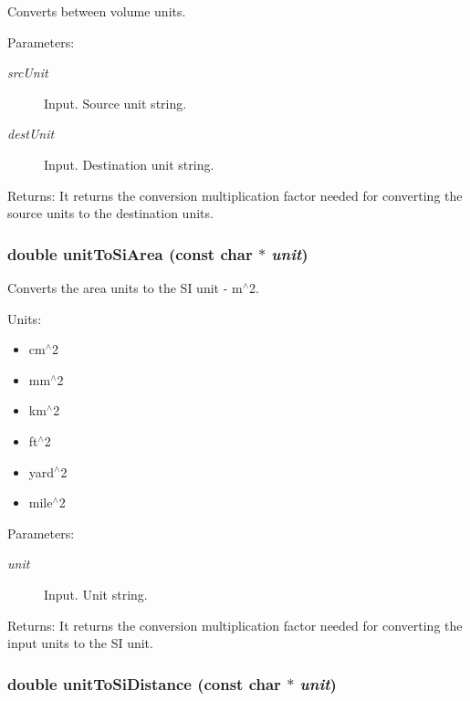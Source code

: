 Converts between volume units. 

\begin{Desc}
\item[Parameters:]
\begin{description}
\item[{\em srcUnit}]Input. Source unit string. \item[{\em destUnit}]Input. Destination unit string.\end{description}
\end{Desc}
\begin{Desc}
\item[Returns:]It returns the conversion multiplication factor needed for converting the source units to the destination units. \end{Desc}
\hypertarget{group__unit__conv_g9a55776d67d05ae1fccb1c8d9fe284f1}{
\subsubsection[unitToSiArea]{\setlength{\rightskip}{0pt plus 5cm}double unitToSiArea (const char $\ast$ {\em unit})}}
\label{group__unit__conv_g9a55776d67d05ae1fccb1c8d9fe284f1}


Converts the area units to the SI unit - m$^\wedge$2. 

Units:\begin{itemize}
\item cm$^\wedge$2\item mm$^\wedge$2\item km$^\wedge$2\item ft$^\wedge$2\item yard$^\wedge$2\item mile$^\wedge$2\end{itemize}


\begin{Desc}
\item[Parameters:]
\begin{description}
\item[{\em unit}]Input. Unit string.\end{description}
\end{Desc}
\begin{Desc}
\item[Returns:]It returns the conversion multiplication factor needed for converting the input units to the SI unit. \end{Desc}
\hypertarget{group__unit__conv_g84e5b74d2c5f3b0bbe1cdb8aff2b11d0}{
\subsubsection[unitToSiDistance]{\setlength{\rightskip}{0pt plus 5cm}double unitToSiDistance (const char $\ast$ {\em unit})}}
\label{group__unit__conv_g84e5b74d2c5f3b0bbe1cdb8aff2b11d0}


